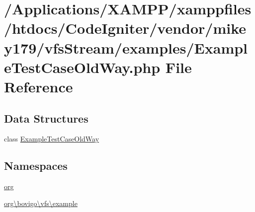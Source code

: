 \hypertarget{_example_test_case_old_way_8php}{}\section{/\+Applications/\+X\+A\+M\+P\+P/xamppfiles/htdocs/\+Code\+Igniter/vendor/mikey179/vfs\+Stream/examples/\+Example\+Test\+Case\+Old\+Way.php File Reference}
\label{_example_test_case_old_way_8php}
\subsection*{Data Structures}
\begin{DoxyCompactItemize}
\item 
class \mbox{\hyperlink{classorg_1_1bovigo_1_1vfs_1_1example_1_1_example_test_case_old_way}{Example\+Test\+Case\+Old\+Way}}
\end{DoxyCompactItemize}
\subsection*{Namespaces}
\begin{DoxyCompactItemize}
\item 
 \mbox{\hyperlink{namespaceorg}{org}}
\item 
 \mbox{\hyperlink{namespaceorg_1_1bovigo_1_1vfs_1_1example}{org\textbackslash{}bovigo\textbackslash{}vfs\textbackslash{}example}}
\end{DoxyCompactItemize}
